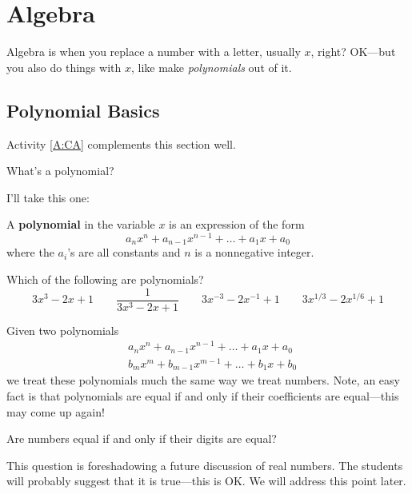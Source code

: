 \section{Algebra}



Algebra is when you replace a number with a letter, usually $x$,
right? OK---but you also do things with $x$, like make
\textit{polynomials} out of it.

\subsection{Polynomial Basics}

\begin{activitynote}
Activity \ref{A:CA} complements this section well.  %
\end{activitynote}



\begin{question} What's a polynomial? 
\end{question}

I'll take this one:
\begin{definition}
A \textbf{polynomial} in the variable $x$ is an expression of the form
\[
a_nx^n + a_{n-1}x^{n-1} + \dots + a_1 x + a_0
\]
where the $a_i$'s are all constants and $n$ is a nonnegative integer.
\end{definition}

\begin{question}
Which of the following are polynomials?
\[
3x^3 - 2x + 1 \qquad \frac{1}{3x^3 - 2x + 1} \qquad 3x^{-3} - 2x^{-1} + 1 \qquad 3x^{1/3} - 2x^{1/6} + 1
\]
\end{question}
\QM


Given two polynomials
\begin{align*}
&a_nx^n + a_{n-1}x^{n-1} + \dots + a_1 x + a_0 \\
&b_mx^m + b_{m-1}x^{m-1} + \dots + b_1 x + b_0
\end{align*}
we treat these polynomials much the same way we treat numbers. Note,
an easy fact is that polynomials are equal if and only if their
coefficients are equal---this may come up again!

\begin{question} Are numbers equal if and only if their digits are equal?
\end{question}
\QM

\begin{teachingnote}
This question is foreshadowing a future discussion of real numbers. The
students will probably suggest that it is true---this is OK. We will
address this point later.
\end{teachingnote}

